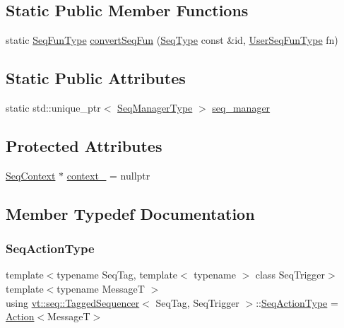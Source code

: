 \subsection*{Static Public Member Functions}
\begin{DoxyCompactItemize}
\item 
static \hyperlink{structvt_1_1seq_1_1_tagged_sequencer_a87fb29cbd9fa0823f2b4fad1ac111993}{Seq\+Fun\+Type} \hyperlink{structvt_1_1seq_1_1_tagged_sequencer_a82dcbcf1d5d0d5370fee8f9ab63e0f30}{convert\+Seq\+Fun} (\hyperlink{structvt_1_1seq_1_1_tagged_sequencer_a1c8ee839258d0f88c49ef660267a81d5}{Seq\+Type} const \&id, \hyperlink{namespacevt_1_1seq_aeb4674d25dcb5d27248b68ec83fad2b6}{User\+Seq\+Fun\+Type} fn)
\end{DoxyCompactItemize}
\subsection*{Static Public Attributes}
\begin{DoxyCompactItemize}
\item 
static std\+::unique\+\_\+ptr$<$ \hyperlink{structvt_1_1seq_1_1_tagged_sequencer_a892e0a759dc975bf74e35f9ebf7a2967}{Seq\+Manager\+Type} $>$ \hyperlink{structvt_1_1seq_1_1_tagged_sequencer_a2c5fd9d4885dc33df2ee11111f9b76be}{seq\+\_\+manager}
\end{DoxyCompactItemize}
\subsection*{Protected Attributes}
\begin{DoxyCompactItemize}
\item 
\hyperlink{structvt_1_1seq_1_1_seq_context}{Seq\+Context} $\ast$ \hyperlink{structvt_1_1seq_1_1_tagged_sequencer_a57d1b3af64ea25946f7431237ee1acd8}{context\+\_\+} = nullptr
\end{DoxyCompactItemize}


\subsection{Member Typedef Documentation}
\mbox{\label{structvt_1_1seq_1_1_tagged_sequencer_a0210dbd34288d440e0cd51db9d6637bd}} 
\subsubsection{\texorpdfstring{Seq\+Action\+Type}{SeqActionType}}
{\footnotesize\ttfamily template$<$typename Seq\+Tag, template$<$ typename $>$ class Seq\+Trigger$>$ \\
template$<$typename MessageT $>$ \\
using \hyperlink{structvt_1_1seq_1_1_tagged_sequencer}{vt\+::seq\+::\+Tagged\+Sequencer}$<$ Seq\+Tag, Seq\+Trigger $>$\+::\hyperlink{structvt_1_1seq_1_1_tagged_sequencer_a0210dbd34288d440e0cd51db9d6637bd}{Seq\+Action\+Type} =  \hyperlink{structvt_1_1seq_1_1_action}{Action}$<$MessageT$>$}

